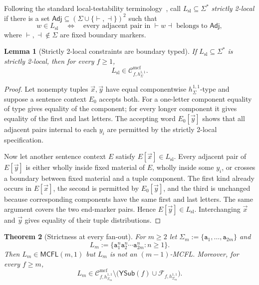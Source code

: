\documentclass[11pt]{article}
\numberwithin{equation}{section}
\theoremstyle{plain}
\newtheorem{theorem}{Theorem}[section]
\newtheorem{lemma}[theorem]{Lemma}
\theoremstyle{definition}
\theoremstyle{remark}
\newcommand{\Cmcf}[2]{\mathcal{C}^{\mathrm{mcf}}_{#1,#2}}
\newcommand{\Ffrag}[2]{\mathcal{F}_{#1,#2}}
\newcommand{\tuple}[1]{\vec{#1}}
\newcommand{\YSub}[1]{\mathsf{YSub}(#1)}
\begin{document}
Following the standard local-testability terminology~\cite{McNaughtonPapert1971}, call
$L_{\mathrm{sl}}\subseteq\Sigma^*$ \emph{strictly 2-local} if there is a set
$\mathsf{Adj}\subseteq(\Sigma\cup\{\vdash,\dashv\})^2$ such that
\[
 w\in L_{\mathrm{sl}}
 \quad\Longleftrightarrow\quad
 \text{every adjacent pair in $\vdash w\dashv$ belongs to $\mathsf{Adj}$},
\]
where $\vdash,\dashv\notin\Sigma$ are fixed boundary markers.

\begin{lemma}[Strictly 2-local constraints are boundary typed]
\label{lem:sl2-boundary-control}
If $L_{\mathrm{sl}}\subseteq\Sigma^*$ is strictly 2-local, then for every $f\ge1$,
\[
  L_{\mathrm{sl}}\in\Cmcf{f}{h_\Sigma^{1,1}}.
\]
\end{lemma}

\begin{proof}
Let nonempty tuples $\tuple x,\tuple y$ have equal componentwise
$h_\Sigma^{1,1}$-type and suppose a sentence context $E_0$ accepts both.
For a one-letter component equality of type gives equality of the component;
for every longer component it gives equality of the first and last letters.
The accepting word $E_0[\tuple y]$ shows that all adjacent pairs internal to
each $y_i$ are permitted by the strictly 2-local specification.

Now let another sentence context $E$ satisfy $E[\tuple x]\in L_{\mathrm{sl}}$.
Every adjacent pair of $E[\tuple y]$ is either wholly inside fixed material of
$E$, wholly inside some $y_i$, or crosses a boundary between fixed material and
a tuple component.  The first kind already occurs in $E[\tuple x]$, the second
is permitted by $E_0[\tuple y]$, and the third is unchanged because
corresponding components have the same first and last letters.  The same
argument covers the two end-marker pairs.  Hence $E[\tuple y]\in L_{\mathrm{sl}}$.
Interchanging $\tuple x$ and $\tuple y$ gives equality of their tuple
distributions.
\end{proof}

\begin{theorem}[Strictness at every fan-out]
\label{thm:every-fanout-strictness}
For $m\ge2$ let
$\Sigma_m:=\{\mathtt a_1,\ldots,\mathtt a_{2m}\}$ and
\[
  L_m:=\{\mathtt a_1^n\mathtt a_2^n\cdots\mathtt a_{2m}^n:n\ge1\}.
\]
Then $L_m\in\mathsf{MCFL}(m,1)$ but $L_m$ is not an $(m-1)$-MCFL.  Moreover,
for every $f\ge m$,
\[
  L_m\in\Cmcf{f}{h_{\Sigma_m}^{1,1}}
  \setminus\bigl(\YSub{f}\cup\Ffrag{f}{h_{\Sigma_m}^{1,1}}\bigr).
\]
\end{theorem}
\end{document}
